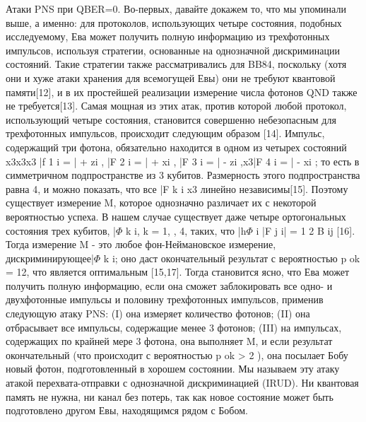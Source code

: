 Атаки PNS при QBER=0. Во-первых, давайте докажем то, что мы упоминали выше, а именно: для протоколов, использующих четыре состояния, подобных исследуемому, Ева может получить полную информацию из трехфотонных импульсов, используя стратегии, основанные на однозначной дискриминации состояний.
Такие стратегии также рассматривались для BB84, поскольку (хотя они и хуже атаки хранения для всемогущей Евы) они не требуют квантовой памяти[12], и в их простейшей реализации измерение числа фотонов QND также не требуется[13].
Самая мощная из этих атак, против которой любой протокол, использующий четыре состояния, становится совершенно небезопасным для трехфотонных импульсов, происходит следующим образом [14]. Импульс, содержащий три фотона, обязательно находится в одном из четырех состояний x3x3x3 |f 1 i = | + zi , |F 2 i = | + xi , |F 3 i = | - zi ,x3|F 4 i = | - xi ; то есть в симметричном подпространстве из 3 кубитов. Размерность этого подпространства равна 4, и можно показать, что все |F k i x3 линейно независимы[15]. Поэтому существует измерение M, которое однозначно различает их с некоторой вероятностью успеха. В нашем случае существует даже четыре ортогональных состояния трех кубитов, |$\Phi$ k i, k = 1, , 4, таких, что |h$\Phi$ i |F j i| = 1 2 B ij [16]. Тогда измерение M - это любое фон-Неймановское измерение, дискриминирующее|$\Phi$ k i; оно даст окончательный результат с вероятностью p ok = 12, что является оптимальным [15,17].
Тогда становится ясно, что Ева может получить полную информацию, если она сможет заблокировать все одно- и двухфотонные импульсы и половину трехфотонных импульсов, применив следующую атаку PNS: (I) она измеряет количество фотонов; (II) она отбрасывает все импульсы, содержащие менее 3 фотонов; (III) на импульсах, содержащих по крайней мере 3 фотона, она выполняет M, и если результат окончательный (что происходит с вероятностью p ok > 2 ), она посылает Бобу новый фотон, подготовленный в хорошем состоянии. Мы называем эту атаку атакой перехвата-отправки с однозначной дискриминацией (IRUD). Ни квантовая память не нужна, ни канал без потерь, так как новое состояние может быть подготовлено другом Евы, находящимся рядом с Бобом.

